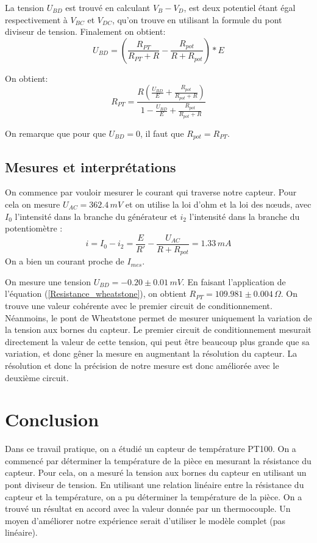 \documentclass[12pt]{article}
\begin{document}
La tension $U_{BD}$ est trouvé en calculant $V_B - V_D$, est deux potentiel étant égal respectivement à $V_{BC}$ et $V_{DC}$, qu'on trouve en utilisant la formule du pont diviseur de tension. Finalement on obtient:
\begin{equation}
U_{BD}=(\frac{R_{PT}}{R_{PT}+R}-\frac{R_{pot}}{R+R_{pot}})*E
\label{Tension_wheatstone}
\end{equation}

On obtient:
\begin{equation}
R_{PT}=\frac{R(\frac{U_{BD}}{E}+\frac{R_{pot}}{R_{pot}+R})}{1-\frac{U_{BD}}{E}+\frac{R_{pot}}{R_{pot}+R}}
\label{Resistance_wheatstone}
\end{equation}

On remarque que pour que $U_{BD}=0$, il faut que $R_{pot}=R_{PT}$.

\subsection{Mesures et interprétations}

On commence par vouloir mesurer le courant qui traverse notre capteur. Pour cela on mesure $U_{AC}=362.4\, mV$ et on utilise la loi d'ohm et la loi des nœuds, avec $I_0$ l'intensité dans la branche du générateur et $i_2$ l'intensité dans la branche du potentiomètre :
\begin{equation}
i=I_0-i_2=\frac{E}{R'}-\frac{U_{AC}}{R+R_{pot}}=1.33\, mA
\end{equation}
On a bien un courant proche de $I_{mes}$.

On mesure une tension $U_{BD}=-0.20\pm 0.01\, mV$. En faisant l'application de l'équation (\ref{Resistance_wheatstone}), on obtient $R_{PT}=109.981\pm 0.004\, \Omega$. On trouve une valeur cohérente avec le premier circuit de conditionnement. Néanmoins, le pont de Wheatstone permet de mesurer uniquement la variation de la tension aux bornes du capteur. Le premier circuit de conditionnement mesurait directement la valeur de cette tension, qui peut être beaucoup plus grande que sa variation, et donc gêner la mesure en augmentant la résolution du capteur. La résolution et donc la précision de notre mesure est donc améliorée avec le deuxième circuit. 

\newpage

\section*{Conclusion}
Dans ce travail pratique, on a étudié un capteur de température PT100. On a commencé par déterminer la température de la pièce en mesurant la résistance du capteur. Pour cela, on a mesuré la tension aux bornes du capteur en utilisant un pont diviseur de tension. En utilisant une relation linéaire entre la résistance du capteur et la température, on a pu déterminer la température de la pièce. On a trouvé un résultat en accord avec la valeur donnée par un thermocouple. Un moyen d'améliorer notre expérience serait d'utiliser le modèle complet (pas linéaire). 
\end{document}
